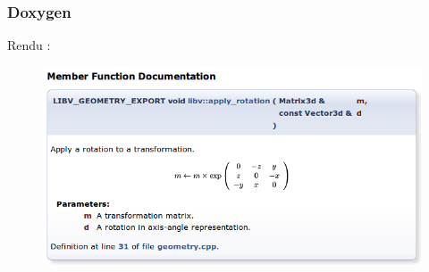 \documentclass{beamer}
\begin{document}
\begin{frame}
  \frametitle{Doxygen}
    \begin{block}{Rendu :}
    \begin{figure}
      \includegraphics[width=0.9\linewidth]{images/doxygen_sample}  
    \end{figure}
    \end{block}

\end{frame}

\end{document}
